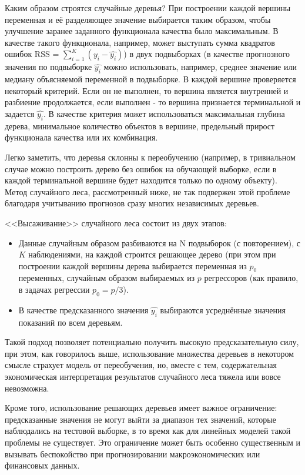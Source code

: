 Каким образом строятся случайные деревья? При построении каждой вершины переменная и её разделяющее значение выбирается таким образом, чтобы улучшение заранее заданного функционала качества было максимальным. В качестве такого функционала, например, может выступать сумма квадратов ошибок RSS = $\sum_{i=1}^{K}(y_i - \hat{y_i})$) в двух подвыборках (в качестве прогнозного значения по подвыборке $\hat{y_i}$ можно использовать, например, среднее значение или медиану объясняемой переменной в подвыборке. В каждой вершине проверяется некоторый критерий. Если он не выполнен, то вершина является внутренней и разбиение продолжается, если выполнен - то вершина признается терминальной и задается $\hat{y_i}$. В качестве критерия может использоваться максимальная глубина дерева, минимальное количество объектов в вершине, предельный прирост функционала качества или их комбинация.

Легко заметить, что деревья склонны к переобучению (например, в тривиальном случае можно построить дерево без ошибок на обучающей выборке, если в каждой терминальной вершине будет находится только по одному объекту). Метод случайного леса, рассмотренный ниже, не так подвержен этой проблеме благодаря учитыванию прогнозов сразу многих независимых деревьев.

<<Высаживание>> случайного леса состоит из двух этапов:
\begin{itemize}
    \item Данные случайным образом разбиваются на N подвыборок (с повторением), с $K$ наблюдениями, на каждой строится решающее дерево (при этом при построении каждой вершины дерева выбирается переменная из $p_0$ переменных, случайным образом выбираемых из $p$ регрессоров (как правило, в задачах регрессии $p_0 = p/3$).
    \item В качестве предсказанного значения $\hat{y_i}$ выбираются усреднённые значения показаний по всем деревьям.
\end{itemize} 


Такой подход позволяет потенциально получить высокую предсказательную силу, при этом, как говорилось выше, использование множества деревьев в некотором смысле страхует модель от переобучения, но, вместе с тем, содержательная экономическая интерпретация результатов случайного леса тяжела или вовсе невозможна.

Кроме того, использование решающих деревьев имеет важное ограничение: предсказанные значения не могут выйти за диапазон тех значений, которые наблюдались на тестовой выборке, в то время как для линейных моделей такой проблемы не существует. Это ограничение может быть особенно существенным и вызывать беспокойство при прогнозировании макроэкономических или финансовых данных.

